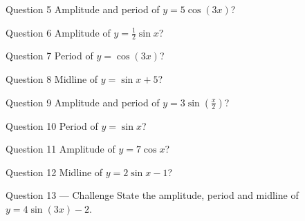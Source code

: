 \documentclass[11pt]{article}
\begin{document}
\begin{qbox}{Question 5}
Amplitude and period of $y=5\cos(3x)$?\workspace{2.4cm}
\end{qbox}

\begin{qbox}{Question 6}
Amplitude of $y=\tfrac12\sin x$?\workspace{2.4cm}
\end{qbox}

\begin{qbox}{Question 7}
Period of $y=\cos(3x)$?\workspace{2.4cm}
\end{qbox}

\begin{qbox}{Question 8}
Midline of $y=\sin x+5$?\workspace{2.4cm}
\end{qbox}

\begin{qbox}{Question 9}
Amplitude and period of $y=3\sin(\tfrac{x}{2})$?\workspace{2.4cm}
\end{qbox}

\begin{qbox}{Question 10}
Period of $y=\sin x$?\workspace{2.4cm}
\end{qbox}

\begin{qbox}{Question 11}
Amplitude of $y=7\cos x$?\workspace{2.4cm}
\end{qbox}

\begin{qbox}{Question 12}
Midline of $y=2\sin x-1$?\workspace{2.4cm}
\end{qbox}

\begin{qbox}{Question 13 --- Challenge}
State the amplitude, period and midline of $y=4\sin(3x)-2$.\workspace{3cm}
\end{qbox}

\clearpage
{}
\end{document}
